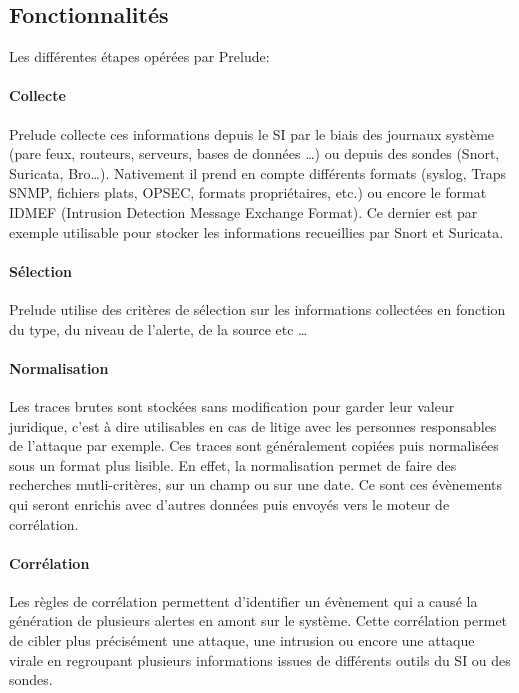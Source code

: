 \documentclass[a4paper,11pt,french]{article}
\begin{document}
\subsection{Fonctionnalités}

Les différentes étapes opérées par Prelude:
\paragraph{Collecte} Prelude collecte ces informations depuis le SI par le biais des journaux système (pare feux, routeurs, serveurs, bases de données …) ou depuis des sondes (Snort, Suricata, Bro…). Nativement il prend en compte différents formats (syslog, Traps SNMP, fichiers plats, OPSEC, formats propriétaires, etc.) ou encore le format IDMEF (Intrusion Detection Message Exchange Format). Ce dernier est par exemple utilisable pour stocker les informations recueillies par Snort et Suricata.

\paragraph{Sélection} Prelude utilise des critères de sélection sur les informations collectées en fonction du type, du niveau de l’alerte, de la source etc …

\paragraph{Normalisation} Les traces brutes sont stockées sans modification pour garder leur valeur juridique, c’est à dire utilisables en cas de litige avec les personnes responsables de l’attaque par exemple. Ces traces sont généralement copiées puis normalisées sous un format plus lisible. En effet, la normalisation permet de faire des recherches mutli-critères, sur un champ ou sur une date. Ce sont ces évènements qui seront enrichis avec d'autres données puis envoyés vers le moteur de corrélation.

\paragraph{Corrélation} Les règles de corrélation permettent d'identifier un évènement qui a causé la génération de plusieurs alertes en amont sur le système. Cette corrélation permet de cibler plus précisément une attaque, une intrusion ou encore une attaque virale en regroupant plusieurs informations issues de différents outils du SI ou des sondes.
~~\\
\end{document}
